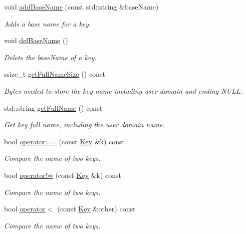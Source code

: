 \begin{DoxyCompactItemize}
void \mbox{\hyperlink{classkdb_1_1Key_ad2f72ce0985413ce588dc33a575ea306}{add\+Base\+Name}} (const std\+::string \&base\+Name)
\begin{DoxyCompactList}\small\item\em Adds a base name for a key. \end{DoxyCompactList}\item 
void \mbox{\hyperlink{classkdb_1_1Key_aec6af8723a31af40f9a16614ea46c341}{del\+Base\+Name}} ()
\begin{DoxyCompactList}\small\item\em Delete the base\+Name of a key. \end{DoxyCompactList}\item 
ssize\+\_\+t \mbox{\hyperlink{classkdb_1_1Key_a92d6ec8adb547051b2861749e25e954e}{get\+Full\+Name\+Size}} () const
\begin{DoxyCompactList}\small\item\em Bytes needed to store the key name including user domain and ending N\+U\+LL. \end{DoxyCompactList}\item 
std\+::string \mbox{\hyperlink{classkdb_1_1Key_aae77aecb3dece445f103b3ce81b02515}{get\+Full\+Name}} () const
\begin{DoxyCompactList}\small\item\em Get key full name, including the user domain name. \end{DoxyCompactList}\item 
bool \mbox{\hyperlink{classkdb_1_1Key_ae52e7f4c4461db5356ddeef64a870cad}{operator==}} (const \mbox{\hyperlink{classkdb_1_1Key}{Key}} \&k) const
\begin{DoxyCompactList}\small\item\em Compare the name of two keys. \end{DoxyCompactList}\item 
bool \mbox{\hyperlink{classkdb_1_1Key_a7cf40dd6e79e63765c9535a8fcee6491}{operator!=}} (const \mbox{\hyperlink{classkdb_1_1Key}{Key}} \&k) const
\begin{DoxyCompactList}\small\item\em Compare the name of two keys. \end{DoxyCompactList}\item 
bool \mbox{\hyperlink{classkdb_1_1Key_aae9d359b54dc0df7d7b3ab3755a09732}{operator$<$}} (const \mbox{\hyperlink{classkdb_1_1Key}{Key}} \&other) const
\begin{DoxyCompactList}\small\item\em Compare the name of two keys. \end{DoxyCompactList}\item 

\end{DoxyCompactItemize}
